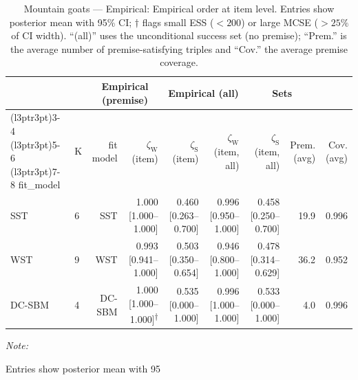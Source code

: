 \begin{table}
\centering
\caption{\label{tab:tab:mountain-goats-empirical-emp-item}Mountain goats — Empirical: Empirical order at item level. Entries show posterior mean with 95\% CI; $\dagger$ flags small ESS ($<200$) or large MCSE ($>25\%$ of CI width). “(all)” uses the unconditional success set (no premise); “Prem.” is the average number of premise-satisfying triples and “Cov.” the average premise coverage.}
\centering
\begin{threeparttable}
\begin{tabular}[t]{llrrrrrrr}
\toprule
\multicolumn{2}{c}{ } & \multicolumn{2}{c}{Empirical (premise)} & \multicolumn{2}{c}{Empirical (all)} & \multicolumn{2}{c}{Sets} \\
\cmidrule(l{3pt}r{3pt}){3-4} \cmidrule(l{3pt}r{3pt}){5-6} \cmidrule(l{3pt}r{3pt}){7-8}
fit_model & K & fit model & $\zeta_{\mathrm{W}}$ (item) & $\zeta_{\mathrm{S}}$ (item) & $\zeta_{\mathrm{W}}$ (item, all) & $\zeta_{\mathrm{S}}$ (item, all) & Prem. (avg) & Cov. (avg)\\
\midrule
SST & 6 & SST & 1.000 [1.000--1.000] & 0.460 [0.263--0.700] & 0.996 [0.950--1.000] & 0.458 [0.250--0.700] & 19.9 & 0.996\\
WST & 9 & WST & 0.993 [0.941--1.000] & 0.503 [0.350--0.654] & 0.946 [0.800--1.000] & 0.478 [0.314--0.629] & 36.2 & 0.952\\
DC-SBM & 4 & DC-SBM & 1.000 [1.000--1.000]\textsuperscript{$\dagger$} & 0.535 [0.000--1.000] & 0.996 [1.000--1.000] & 0.533 [0.000--1.000] & 4.0 & 0.996\\
\bottomrule
\end{tabular}
\begin{tablenotes}
\item \textit{Note: } 
\item Entries show posterior mean with 95%
\end{tablenotes}
\end{threeparttable}
\end{table}